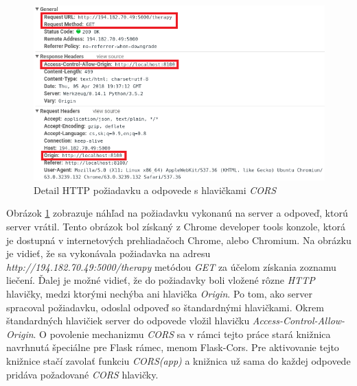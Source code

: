 \begin{figure}[h]
  \centering
  \includegraphics[scale=0.8]{fig/cors.png}
  \caption{Detail HTTP požiadavku a odpovede s hlavičkami \textit{CORS}}
  \label{fig:cors}
\end{figure}
Obrázok \ref{fig:cors} zobrazuje náhľad na požiadavku vykonanú na server a odpoveď, ktorú server vrátil. Tento obrázok bol získaný z Chrome developer tools konzole, ktorá je dostupná v internetových prehliadačoch Chrome, alebo Chromium. Na obrázku je vidieť, že sa vykonávala požiadavka na adresu \textit{http://194.182.70.49:5000/therapy} metódou \textit{GET} za účelom získania zoznamu liečení. Ďalej je možné vidieť, že do požiadavky boli vložené rôzne \textit{HTTP} hlavičky, medzi ktorými nechýba ani hlavička \textit{Origin}. Po tom, ako server spracoval požiadavku, odoslal odpoveď so štandardnými hlavičkami. Okrem štandardných hlavičiek server do odpovede vložil hlavičku \textit{Access-Control-Allow-Origin}. O povolenie mechanizmu \textit{CORS} sa v rámci tejto práce stará knižnica navrhnutá špeciálne pre Flask rámec, menom Flask-Cors.  Pre aktivovanie tejto knižnice stačí zavolať funkciu \textit{CORS(app)} a knižnica už sama do každej odpovede pridáva požadované \textit{CORS} hlavičky.

